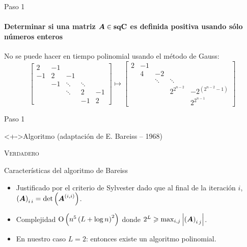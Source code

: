 \documentclass[spanish]{beamer}
\begin{document}
\begin{frame}{Paso 1}
  \framesubtitle{Determinar si una matriz $\boldsymbol{A} \in \mathbf{sqC}$ es definida 
  positiva usando sólo números enteros}
  No se puede hacer en tiempo polinomial usando el método de Gauss:
  \begin{equation*}
  \begin{bmatrix}2 & -1\\
  -1 & 2 & -1\\
  & -1 & \ddots & \ddots\\
  &  & \ddots & 2 & -1\\
  &  &  & -1 & 2
  \end{bmatrix}\mapsto\begin{bmatrix}2 & -1\\
  & 4 & -2\\
  &  & \ddots & \ddots\\
  &  &  & 2^{2^{n-2}} & -2^{\left(2^{n-2}-1\right)}\\
  &  &  &  & 2^{2^{n-1}}
  \end{bmatrix}
  \end{equation*}
\end{frame}

\begin{frame}{Paso 1}
  \begin{block}<+->{Algoritmo (adaptación de E. Bareiss -- 1968)}
    \begin{algorithm}[H]
      \Return \textsc{Verdadero}
    \end{algorithm}
  \end{block}
\end{frame}

\begin{frame}{Características del algoritmo de Bareiss}
  \begin{itemize}[<+->]
    \item Justificado por el criterio de Sylvester dado que al final de la 
    iteración $i$, $\left({\boldsymbol{A}}\right)_{{i}\,{i}} = \det\left(\boldsymbol{A}^{\left({i, 
    i}\right)}\right)$.
    \item Complejidad $\operatorname{O}\left( n^5\left(L + \log n\right)^2 \right)$ donde $2^L \ge 
    \max_{i, j}\abs{\entry{\mat{A}}{i}{j}}$.
   \item En nuestro caso $L = 2$: entonces existe un algoritmo polinomial.
  \end{itemize}
\end{frame}
\end{document}
